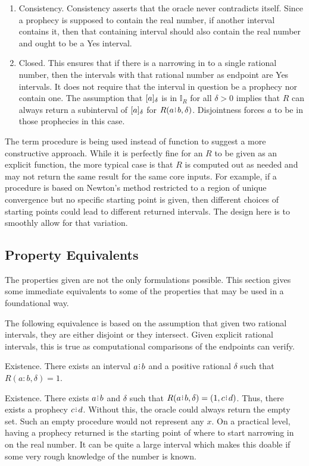 \documentclass[12pt]{article}
\begin{document}
\begin{enumerate}
    \item Consistency. Consistency asserts that the oracle never contradicts itself. Since a prophecy is supposed to contain the real number, if another interval contains it, then that containing interval should also contain the real number and ought to be a Yes interval. 
    
    \item Closed. This ensures that if there is a narrowing in to a single rational number, then the intervals with that rational number as endpoint are Yes intervals. It does not require that the interval in question be a prophecy nor contain one. The assumption that $[a]_{\delta}$ is in $\mathbb{I}_R$ for all $\delta >0$ implies that $R$ can always return a subinterval of $[a]_{\delta}$ for $R(a\rint b, \delta)$. Disjointness forces $a$ to be in those prophecies in this case. 

\end{enumerate}

The term procedure is being used instead of function to suggest a more constructive approach. While it is perfectly fine for an $R$ to be given as an explicit function, the more typical case is that $R$ is computed out as needed and may not return the same result for the same core inputs. For example, if a procedure is based on Newton's method restricted to a region of unique convergence but no specific starting point is given, then different choices of starting points could lead to different returned intervals. The design here is to smoothly allow for that variation. 

\subsection{Property Equivalents}

The properties given are not the only formulations possible. This section gives some immediate equivalents to some of the properties that may be used in a foundational way. 

The following equivalence is based on the assumption that given two rational intervals, they are either disjoint or they intersect. Given explicit rational intervals, this is true as computational comparisons of the endpoints can verify. 

     Existence. There exists an interval $a \rint b$ and a positive rational $\delta$ such that $R(a:b, \delta) = 1$. 

     Existence. There exists $a \rint b$ and $\delta$ such that $R(a \rint b, \delta) = (1, c\rint d)$. Thus, there exists a prophecy $c \rint d$. Without this, the oracle could always return the empty set. Such an empty procedure would not represent any $x$. On a practical level, having a prophecy returned is the starting point of where to start narrowing in on the real number. It can be quite a large interval which makes this doable if some very rough knowledge of the number is known. 
\end{document}
